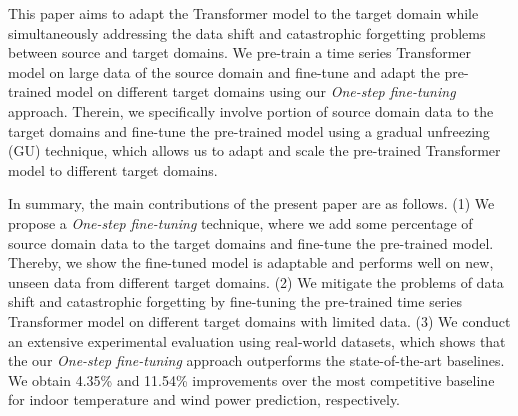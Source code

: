\documentclass[letterpaper]{article} %
\begin{document}
This paper aims to adapt the Transformer model to the target domain while simultaneously addressing the data shift and catastrophic forgetting problems between source and target domains. We pre-train a time series Transformer model on large data of the source domain and fine-tune and adapt the pre-trained model on different target domains using our \emph{One-step fine-tuning} approach. Therein, we specifically involve portion of source domain data to the target domains and fine-tune the pre-trained model using a gradual unfreezing (GU) \cite{howard2018universal} technique, which allows us to adapt and scale the pre-trained Transformer model to different target domains.

In summary, the main contributions of the present paper are as follows.
(1) We propose a \emph{One-step fine-tuning} technique, where we add some percentage of source domain data to the target domains and fine-tune the pre-trained model. Thereby, we show the fine-tuned model is adaptable and performs well on new, unseen data from different target domains. (2) We mitigate the problems of data shift and catastrophic forgetting by fine-tuning the pre-trained time series Transformer model on different target domains with limited data. (3) We conduct an extensive experimental evaluation using real-world datasets, which shows that the our \emph{One-step fine-tuning} approach outperforms the state-of-the-art baselines. We obtain 4.35\% and 11.54\% improvements over the most competitive baseline for indoor temperature and wind power prediction, respectively.
\end{document}
